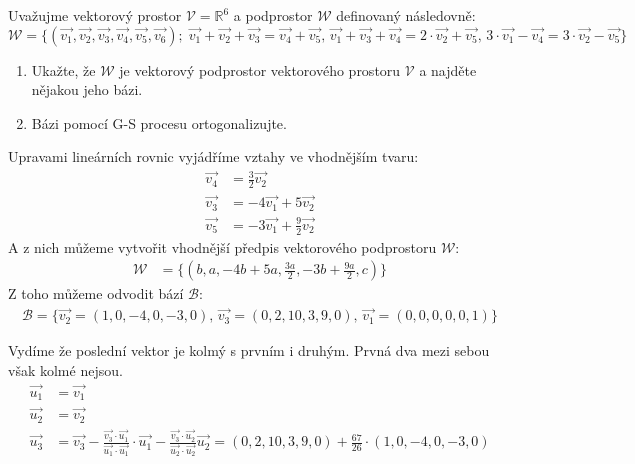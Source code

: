 \begin{example}
    Uvažujme vektorový prostor $\mathcal{V} = \mathbb{R}^6$ a podprostor
    $\mathcal{W}$ definovaný následovně:
    $$\mathcal{W} = \{(\vec{v_1}, \vec{v_2}, \vec{v_3}, \vec{v_4}, \vec{v_5}, \vec{v_6});\;
    \vec{v_1} + \vec{v_2} + \vec{v_3} = \vec{v_4} + \vec{v_5},\,
    \vec{v_1} + \vec{v_3} + \vec{v_4} = 2\cdot \vec{v_2} + \vec{v_5},\,
    3\cdot \vec{v_1} - \vec{v_4} = 3\cdot \vec{v_2} - \vec{v_5}\}$$

    \begin{enumerate}
        \item Ukažte, že $\mathcal{W}$ je vektorový podprostor vektorového prostoru
        $\mathcal{V}$ a najděte nějakou jeho bázi.
        \item Bázi pomocí G-S procesu ortogonalizujte.
    \end{enumerate}

    Upravami lineárních rovnic vyjádříme vztahy ve vhodnějším tvaru:
    \begin{align*}
        \vec{v_4} &= \frac{3}{2} \vec{v_2}\\
        \vec{v_3} &= -4 \vec{v_1} + 5 \vec{v_2} \\
        \vec{v_5} &= -3 \vec{v_1} + \frac{9}{2} \vec{v_2}
    \end{align*}
    A z nich můžeme vytvořit vhodnější předpis vektorového podprostoru $\mathcal{W}$:
    \begin{align*}
        \mathcal{W} &= \{(b, a,-4b + 5a , \frac{3a}{2}, -3b + \frac{9a}{2}, c)\}
    \end{align*}
    Z toho můžeme odvodit bází $\mathcal{B}$:
    \begin{align*}
        \mathcal{B} = \{\vec{v_2} = (1, 0, -4, 0, -3, 0),\, \vec{v_3} = (0, 2, 10, 3, 9, 0),\, \vec{v_1} = (0, 0, 0, 0, 0, 1)\}
    \end{align*}

    Vydíme že poslední vektor je kolmý s prvním i druhým. Prvná dva mezi sebou však kolmé nejsou.
    \begin{align*}
        \vec{u_1} & = \vec{v_1}\\
        \vec{u_2} &= \vec{v_2}\\
        \vec{u_3} &= \vec{v_3} - \frac{\vec{v_3} \cdot \vec{u_1}}{\vec{u_1}
        \cdot \vec{u_1}} \cdot \vec{u_1} - \frac{\vec{v_3} \cdot \vec{u_2}}{\vec{u_2}
        \cdot \vec{u_2}} \vec{u_2} = (0, 2, 10, 3, 9, 0) + \frac{67}{26} \cdot (1, 0, -4, 0, -3, 0)\\
    \end{align*}
\end{example}

